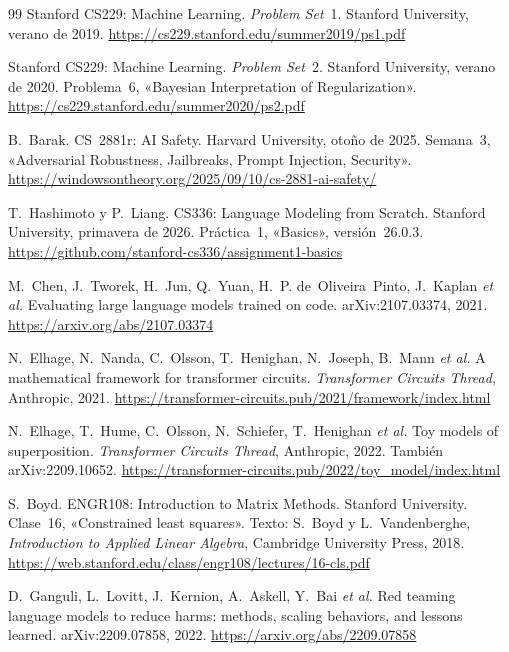 \begin{thebibliography}{99}
Stanford CS229: Machine Learning.
\newblock \emph{Problem Set}~1.
\newblock Stanford University, verano de 2019.
\newblock \url{https://cs229.stanford.edu/summer2019/ps1.pdf}

Stanford CS229: Machine Learning.
\newblock \emph{Problem Set}~2.
\newblock Stanford University, verano de 2020. Problema~6, «Bayesian Interpretation of Regularization».
\newblock \url{https://cs229.stanford.edu/summer2020/ps2.pdf}

B.~Barak.
\newblock CS~2881r: AI Safety.
\newblock Harvard University, otoño de 2025. Semana~3, «Adversarial Robustness, Jailbreaks, Prompt Injection, Security».
\newblock \url{https://windowsontheory.org/2025/09/10/cs-2881-ai-safety/}

T.~Hashimoto y P.~Liang.
\newblock CS336: Language Modeling from Scratch.
\newblock Stanford University, primavera de 2026. Práctica~1, «Basics», versión~26.0.3.
\newblock \url{https://github.com/stanford-cs336/assignment1-basics}

M.~Chen, J.~Tworek, H.~Jun, Q.~Yuan, H.~P. de~Oliveira~Pinto, J.~Kaplan \emph{et al.}
\newblock Evaluating large language models trained on code.
\newblock arXiv:2107.03374, 2021.
\newblock \url{https://arxiv.org/abs/2107.03374}

N.~Elhage, N.~Nanda, C.~Olsson, T.~Henighan, N.~Joseph, B.~Mann \emph{et al.}
\newblock A mathematical framework for transformer circuits.
\newblock \emph{Transformer Circuits Thread}, Anthropic, 2021.
\newblock \url{https://transformer-circuits.pub/2021/framework/index.html}

N.~Elhage, T.~Hume, C.~Olsson, N.~Schiefer, T.~Henighan \emph{et al.}
\newblock Toy models of superposition.
\newblock \emph{Transformer Circuits Thread}, Anthropic, 2022. También arXiv:2209.10652.
\newblock \url{https://transformer-circuits.pub/2022/toy_model/index.html}

S.~Boyd.
\newblock ENGR108: Introduction to Matrix Methods.
\newblock Stanford University. Clase~16, «Constrained least squares». Texto: S.~Boyd y L.~Vandenberghe, \emph{Introduction to Applied Linear Algebra}, Cambridge University Press, 2018.
\newblock \url{https://web.stanford.edu/class/engr108/lectures/16-cls.pdf}

D.~Ganguli, L.~Lovitt, J.~Kernion, A.~Askell, Y.~Bai \emph{et al.}
\newblock Red teaming language models to reduce harms: methods, scaling behaviors, and lessons learned.
\newblock arXiv:2209.07858, 2022.
\newblock \url{https://arxiv.org/abs/2209.07858}


\end{thebibliography}
